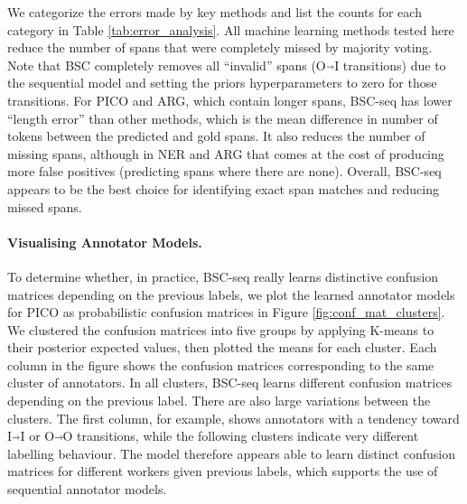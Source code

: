 We categorize the errors made by key methods and list the
counts for each category in Table \ref{tab:error_analysis}.
All machine learning methods tested here reduce the number of spans that were completely missed by majority voting. Note that BSC completely removes all ``invalid'' spans
(O$\Arrow{0.2cm}$I transitions) due to the sequential model and setting the priors hyperparameters
to zero for those transitions.
For PICO and ARG, which contain longer spans,
BSC-seq has lower ``length error'' than other methods,
 which is the mean difference in number of tokens between the predicted and gold spans. 
 It also reduces the number of missing spans, although in NER and ARG that comes at the cost of producing more false positives (predicting spans where there are none).
Overall, BSC-seq appears to be the best choice for identifying 
exact span matches and reducing missed spans.

\paragraph{Visualising Annotator Models. }
To determine whether, in practice, BSC-seq really learns distinctive confusion matrices depending on the previous labels,
we plot the learned annotator models for
PICO as probabilistic confusion matrices in Figure \ref{fig:conf_mat_clusters}.
We clustered 
the confusion matrices %
into five groups by applying K-means to their posterior expected values,
then plotted the means for each cluster.
Each column in the figure shows the confusion matrices corresponding to the same cluster of annotators. 
In all clusters, BSC-seq learns different 
confusion matrices depending on the previous label.
There are also large variations between the clusters.
The first column, for example, shows
annotators with a tendency toward I$\Arrow{0.2cm}$I or O$\Arrow{0.2cm}$O transitions, while the following clusters 
indicate very different labelling behaviour. The model therefore appears able to learn
distinct confusion matrices for different workers given previous labels, 
which supports the use of sequential
annotator models.

